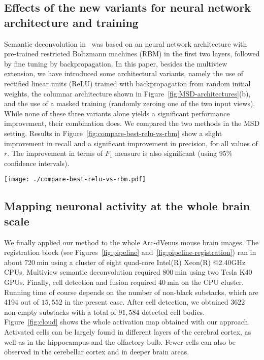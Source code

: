 \documentclass[smallextended]{svjour3}       %
\begin{document}
\subsection{Effects of the new variants for neural network architecture and training}
Semantic deconvolution in~\cite{frasconi_large-scale_2014} was based
on an neural network architecture with pre-trained restricted Boltzmann
machines (RBM) in the first two layers, followed by fine tuning by
backpropagation. In this paper, besides the multiview extension, we
have introduced some architectural variants, namely the use of
rectified linear units (ReLU) trained with backpropagation from random
initial weights, the columnar architecture shown in
Figure~\ref{fig:MSD-architectures}(b), and the use of a masked
training (randomly zeroing one of the two input views). While
none of these three variants alone yields a significant performance
improvement, their combination does. We compared the two methods in
the MSD setting. Results in Figure~\ref{fig:compare-best-relu-vs-rbm}
show a slight improvement in recall and a significant improvement in
precision, for all values of $r$. The improvement in terms of $F_1$
measure is also significant (using 95\% confidence intervals).
\begin{figure*}
  \centering
  \texttt{[image: ./compare-best-relu-vs-rbm.pdf]}
  \caption{MSD: comparison between the former finely tuned RBM
    architecture~\cite{frasconi_large-scale_2014} and the new
    architecture based on ReLUs, columnar structure, and masked
    training.}
  \label{fig:compare-best-relu-vs-rbm}
\end{figure*}


\subsection{Mapping neuronal activity at the whole brain scale}
\label{sec:mapping}
We finally applied our method to the whole Arc-dVenus mouse brain
images. The registration block (see Figures~\ref{fig:pipeline}
and~\ref{fig:pipeline-registration}) ran in about $\SI{720}{\minute}$
using a cluster of eight quad-core Intel(R) Xeon(R) @2.40GHz
CPUs. Multiview semantic deconvolution required $\SI{800}{\minute}$
using two Tesla K40 GPUs. Finally, cell detection and fusion
required $\SI{40}{\minute}$ on the CPU cluster. Running time of course
depends on the number of non-black substacks, which are 4194 out of
$15,552$ in the present case.
After cell detection, we obtained 3622 non-empty substacks with a total of
$91,584$ detected cell bodies. Figure~\ref{fig:cloud} shows the whole
activation map obtained with our approach. Activated cells can be largely found in different layers of the cerebral
cortex, as well as in the hippocampus and the olfactory bulb. Fewer cells can also be observed in the cerebellar
cortex and in deeper brain areas.
\end{document}
